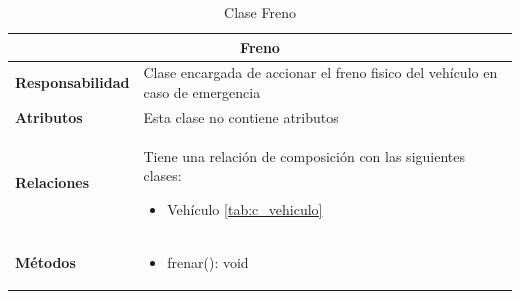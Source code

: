 \begin{table}[H]
\begin{center}
\begin{tabular}{p{} p{11cm}}
\multicolumn{2}{c}{\textbf{Freno} } \\ \hline \hline
\textbf{Responsabilidad} &   Clase encargada de accionar el freno fisico del vehículo en caso de emergencia  \\ \hline
\textbf{Atributos} & Esta clase no contiene atributos\\ \hline
\textbf{Relaciones} & \par Tiene una relación de composición con las siguientes clases:
                      \begin{itemize}
                        \item Vehículo \ref{tab:c_vehiculo}
                      \end{itemize}

                      \\ \hline

\textbf{Métodos} &  \begin{itemize}
                      \item frenar(): void
                    \end{itemize}\\ \hline
\end{tabular}
\caption{Clase Freno}
\label{tab:c_freno}
\end{center}
\end{table}








